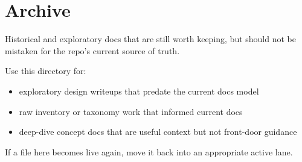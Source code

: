 \chapter{Archive}\label{record-423}

\smallskip

Historical and exploratory docs that are still worth keeping, but should not be mistaken for the repo's current source of truth.

Use this directory for:

\begin{itemize}
\tightlist
\item
  exploratory design writeups that predate the current docs model
\item
  raw inventory or taxonomy work that informed current docs
\item
  deep-dive concept docs that are useful context but not front-door guidance
\end{itemize}

If a file here becomes live again, move it back into an appropriate active lane.

